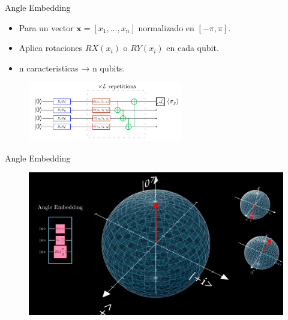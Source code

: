 \documentclass{beamer}
\begin{document}
\begin{frame}{Angle Embedding}
  \begin{itemize}
    \item Para un vector $\mathbf{x}=[x_1,\dots,x_n]$ normalizado en $[-\pi,\pi]$.
    \item Aplica rotaciones $RX(x_i)$ o $RY(x_i)$ en cada qubit.
    \item n caracteristicas → n qubits.
  \end{itemize}
  \vspace{1em}
  \begin{figure}
    \centering
    \includegraphics[width=0.6\textwidth]{angleemb.png}
  \end{figure}
\end{frame}

\begin{frame}{Angle Embedding}
  \begin{figure}
    \includegraphics[width=1\textwidth]{blochh.png}
  \end{figure}
\end{frame}
\end{document}
